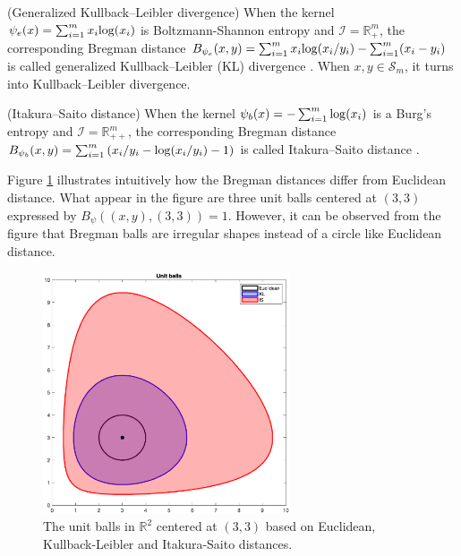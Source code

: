 \documentclass{svjour3}                %
\def \R {{\mathbb{R}}}
\def \S {{\mathcal{S}}}
\def \I {{\mathcal{I}}}
\begin{document}
\begin{example}\label{KL}
(Generalized Kullback–Leibler divergence) When the kernel $\psi_e(x)=\sum_{i=1}^m x_i {\rm log}(x_i)$ is Boltzmann-Shannon entropy and $\I=\R_{+}^m$, the corresponding Bregman distance $B_{\psi_e}(x,y)=\sum_{i=1}^m x_i {\rm log} (x_i/y_i) -\sum_{i=1}^m (x_i - y_i)$ is called generalized Kullback–Leibler (KL) divergence \cite{KL51}. When $x,y\in\S_m$, it turns into Kullback–Leibler divergence.
\end{example}

\begin{example}\label{IS}
(Itakura–Saito distance) When the kernel $\psi_b(x)=-\sum_{i=1}^m {\rm log}(x_i)$ is a Burg’s entropy and $\I=\R_{++}^m$, the corresponding Bregman distance $B_{\psi_b}(x,y)=\sum_{i=1}^m \left( x_i/y_i-{\rm log}(x_i/y_i)-1 \right)$ is called Itakura–Saito distance \cite{IS68}.
\end{example}
Figure \ref{UNIT_BALLS} illustrates intuitively how the Bregman distances differ from Euclidean distance. What appear in the figure are three unit balls centered at $(3,3)$ expressed by $B_{\psi}((x,y),(3,3))=1$. However, it can be observed from the figure that Bregman balls are irregular shapes instead of a circle like Euclidean distance.

\begin{figure}[H]
\centering 
\includegraphics[width=0.65\textwidth]{unit_balls.eps}
\caption{The unit balls in $\R^2$ centered at $(3,3)$ based on Euclidean, Kullback-Leibler and Itakura-Saito distances.}
\label{UNIT_BALLS}
\end{figure}
\end{document}
